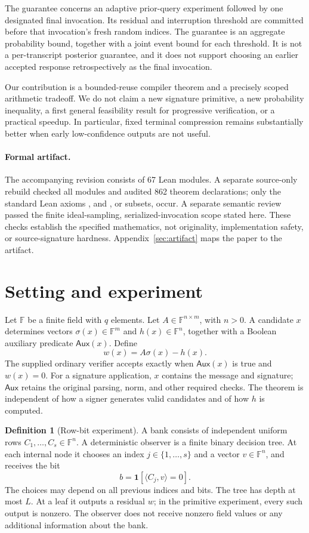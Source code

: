 \documentclass[11pt,letterpaper]{article}
\theoremstyle{definition}
\newtheorem{definition}[theorem]{Definition}
\newcommand{\F}{\mathbb F}
\newcommand{\Aux}{\mathsf{Aux}}
\newcommand{\dotp}[2]{\langle #1,#2\rangle}
\newcommand{\code}[1]{\texttt{\small\detokenize{#1}}}
\begin{document}
The guarantee concerns an adaptive prior-query experiment followed by one designated final invocation. Its residual and interruption threshold are committed before that invocation's fresh random indices. The guarantee is an aggregate probability bound, together with a joint event bound for each threshold. It is not a per-transcript posterior guarantee, and it does not support choosing an earlier accepted response retrospectively as the final invocation.

Our contribution is a bounded-reuse compiler theorem and a precisely scoped arithmetic tradeoff. We do not claim a new signature primitive, a new probability inequality, a first general feasibility result for progressive verification, or a practical speedup. In particular, fixed terminal compression remains substantially better when early low-confidence outputs are not useful.

\paragraph{Formal artifact.}
The accompanying revision consists of 67 Lean modules. A separate source-only rebuild checked all modules and audited 862 theorem declarations; only the standard Lean axioms \code{propext}, \code{Classical.choice} and \code{Quot.sound}, or subsets, occur. A separate semantic review passed the finite ideal-sampling, serialized-invocation scope stated here. These checks establish the specified mathematics, not originality, implementation safety, or source-signature hardness. Appendix~\ref{sec:artifact} maps the paper to the artifact.

\section{Setting and experiment}
\label{sec:model}
Let $\F$ be a finite field with $q$ elements. Let $A\in\F^{n\times m}$, with $n>0$. A candidate $x$ determines vectors $\sigma(x)\in\F^m$ and $h(x)\in\F^n$, together with a Boolean auxiliary predicate $\Aux(x)$. Define
\[
 w(x)=A\sigma(x)-h(x).
\]
The supplied ordinary verifier accepts exactly when $\Aux(x)$ is true and $w(x)=0$. For a signature application, $x$ contains the message and signature; $\Aux$ retains the original parsing, norm, and other required checks. The theorem is independent of how a signer generates valid candidates and of how $h$ is computed.

\begin{definition}[Row-bit experiment]
A bank consists of independent uniform rows $C_1,\ldots,C_s\in\F^n$. A deterministic observer is a finite binary decision tree. At each internal node it chooses an index $j\in\{1,\ldots,s\}$ and a vector $v\in\F^n$, and receives the bit
\[
 b=\mathbf 1[\dotp{C_j}{v}=0].
\]
The choices may depend on all previous indices and bits. The tree has depth at most $L$. At a leaf it outputs a residual $w$; in the primitive experiment, every such output is nonzero. The observer does not receive nonzero field values or any additional information about the bank.
\end{definition}
\end{document}
